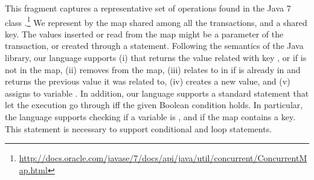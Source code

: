 	\normalsize
This fragment captures a representative set of operations found in the Java 7 class .\footnote{\url{http://docs.oracle.com/javase/7/docs/api/java/util/concurrent/ConcurrentMap.html}} We represent by  the map shared among all the transactions, and  a shared key. The values inserted or read from the map might be a parameter of the transaction, or created through a  statement. Following the semantics of the Java library, our language supports (i)  that returns the value  related with key , or  if  is not in the map, (ii)  removes  from the map, (iii)  relates  to  in  if  is already in  and returns the previous value it was related to, (iv)  creates a new value, and (v)  assigns  to variable . In addition, our language supports a standard  statement that let the execution go through iff the given Boolean condition holds. In particular, the language supports checking if a variable is , and if the map contains a key. This statement is necessary to support conditional and loop statements.


%
%	
%
%
%


